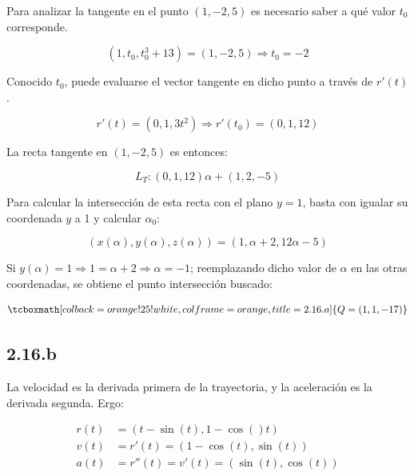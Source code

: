 \documentclass{article}
\begin{document}
Para analizar la tangente en el punto $(1, -2, 5)$ es necesario saber a qué valor $t_0$ corresponde.

\begin{equation}
(1, t_0, t_0^3+13) = (1, -2, 5) \Rightarrow t_0 = -2
\end{equation}

Conocido $t_0$, puede evaluarse el vector tangente en dicho punto a través de $r'(t)$.

\begin{equation}
r'(t) = (0, 1, 3t^2) \Rightarrow r'(t_0) = (0, 1, 12)
\end{equation}

La recta tangente en $(1, -2, 5)$ es entonces:

\begin{equation}
L_T: (0, 1, 12) \alpha + (1, 2, -5)
\end{equation}

Para calcular la intersección de esta recta con el plano $y = 1$, basta con igualar su coordenada $y$ a 1 y calcular $\alpha_0$:

\begin{equation}
(x(\alpha), y(\alpha), z(\alpha)) = (1, \alpha+2, 12\alpha-5)
\end{equation}

Si $y(\alpha) = 1 \Rightarrow 1 = \alpha + 2 \Rightarrow \alpha = -1$; reemplazando dicho valor de $\alpha$ en las otras coordenadas, se obtiene el punto intersección buscado:

\begin{equation}
\tcboxmath[colback=orange!25!white,colframe=orange,title=2.16.a]
{
Q = (1, 1, -17)
}
\end{equation}

\subsection*{2.16.b}
\label{subsec:2.16.b}

La velocidad es la derivada primera de la trayectoria, y la aceleración es la derivada segunda. Ergo:

\begin{subequations}
\begin{align}
r(t) &= (t - \sin(t), 1 - \cos()t) \\
v(t) &= r'(t) = (1 - \cos(t), \sin(t)) \\
a(t) &= r''(t) = v'(t) = (\sin(t), \cos(t))
\end{align}
\end{subequations}
\end{document}
